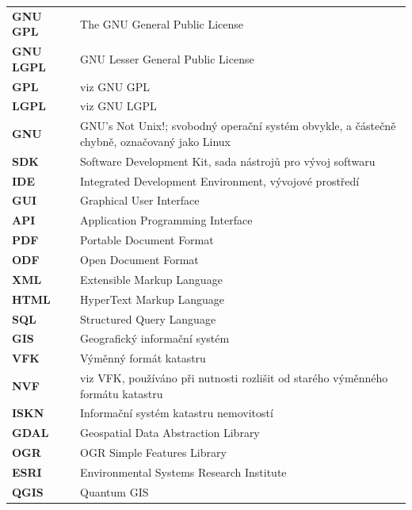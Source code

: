 \documentclass[a4paper,12pt]{article}
\newcommand{\radekZkr}[2]{\textbf{#1} & #2 \\}
\begin{document}
\begin{tabular}{p{}p{}}

\radekZkr{GNU GPL}{The GNU General Public License}
\radekZkr{GNU LGPL}{GNU Lesser General Public License}
\radekZkr{GPL}{viz GNU GPL}
\radekZkr{LGPL}{viz GNU LGPL}
\radekZkr{GNU}{GNU's Not Unix!; svobodný operační systém obvykle, a částečně chybně, označovaný jako Linux}

\radekZkr{SDK}{Software Development Kit, sada nástrojů pro vývoj softwaru}
\radekZkr{IDE}{Integrated Development Environment, vývojové prostředí}
\radekZkr{GUI}{Graphical User Interface}
\radekZkr{API}{Application Programming Interface}

\radekZkr{PDF}{Portable Document Format}
\radekZkr{ODF}{Open Document Format}
\radekZkr{XML}{Extensible Markup Language}
\radekZkr{HTML}{HyperText Markup Language}
\radekZkr{SQL}{Structured Query Language}

\radekZkr{GIS}{Geografický informační systém}

\radekZkr{VFK}{Výměnný formát katastru}
\radekZkr{NVF}{viz VFK, používáno při nutnosti rozlišit od starého výměnného formátu katastru}
\radekZkr{ISKN}{Informační systém katastru nemovitostí}

\radekZkr{GDAL}{Geospatial Data Abstraction Library}
\radekZkr{OGR}{OGR Simple Features Library}
\radekZkr{ESRI}{Environmental Systems Research Institute}
\radekZkr{QGIS}{Quantum GIS}

\end{tabular}
\end{document}
